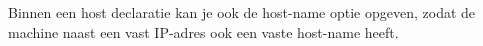 Binnen een host declaratie kan je ook de host-name optie opgeven, zodat de machine naast een vast IP-adres ook een vaste host-name heeft.
